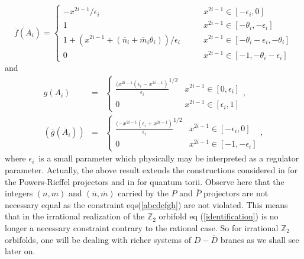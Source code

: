 \documentclass[a4paper,12pt]{article}
\begin{document}
\begin{equation}
\overline{f}\left( \overline{A}_{i}\right) =\left\{
\begin{array}{ll}
-x^{2i-1}/\epsilon _{i} & x^{2i-1}\in \left[ -\epsilon _{i},0\right] \\
1 & x^{2i-1}\in \left[ -\theta _{i},-\epsilon _{i}\right] \\
1+\left( x^{2i-1}+({\overline n}_{i}+{\overline m}_{i}\theta _{i})\right) /\epsilon _{i}\quad \quad
& x^{2i-1}\in \left[ -\theta _{i}-\epsilon _{i},-\theta _{i}\right] \\
0 & x^{2i-1}\in \left[ -1,-\theta _{i}-\epsilon _{i}\right]
\end{array}
\right.
\end{equation}
and
\begin{eqnarray}
g\left( A_{i}\right) &=&\left\{
\begin{array}{cc}
\frac{(x^{2i-1}\left( \epsilon _{i}-x^{2i-1}\right) }{\epsilon _{i}}^{1/2} &
x^{2i-1}\in \left[ 0,\epsilon _{i}\right] \\
0 & x^{2i-1}\in \left[ \epsilon _{i},1\right]
\end{array}
\right. , \\
\left( \overline{g}\left( \overline{A}_{i}\right) \right) &=&\left\{
\begin{array}{cc}
\frac{(-x^{2i-1}\left( \epsilon _{i}+x^{2i-1}\right) }{\epsilon _{i}}^{1/2}
& x^{2i-1}\in \left[ -\epsilon _{i},0\right] \\
0 & x^{2i-1}\in \left[ -1,-\epsilon _{i}\right]
\end{array}
\right. ,
\end{eqnarray}
where $\epsilon _{i}$\ is a small parameter which physically may be
interpreted as a regulator parameter. Actually, the above result extends the
constructions considered in \cite{g} for the Powers-Rieffel projectors and
in \cite{j} for quantum torii. Observe here that the integers $(n,m)$ and
$(\overline{n},\overline{m})$ carried by the $P$ and $\overline{P}$
projectors are not necessary equal as the constraint eqs(\ref{abcdefgh}) are not
violated. This means that in the irrational realization of the $\mathbb{Z}%
_{2} $ orbifold eq (\ref{identification}) is no longer a necessary constraint contrary to the
rational case. So for irrational $\mathbb{Z}_{2}$ orbifolds, one will be
dealing with richer systems of $D-\overline{D}$ branes as we shall see later
on.
\end{document}
